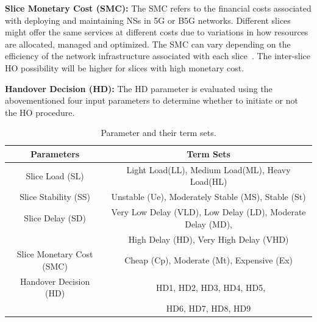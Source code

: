 \documentclass[graybox]{svmult}
\begin{document}
\textbf{Slice Monetary Cost (SMC):} The SMC refers to the financial costs associated with deploying and maintaining NSs in 5G or B5G networks. Different slices might offer the same services at different costs due to variations in how resources are allocated, managed and optimized. The SMC can vary depending on the efficiency of the network infrastructure associated with each slice~\cite{walia2021virtualization}. The inter-slice HO possibility will be higher for slices with high monetary cost. 

\textbf{Handover Decision (HD):} The HD parameter is evaluated using the abovementioned four input parameters to determine whether to initiate or not the HO procedure. 


\begin{table}\centering
	\caption{Parameter and their term sets.}
	\label{tab:Parameter}%
	\begin{tabular}{c | c }\hline
		Parameters & Term Sets \\\hline
	    Slice Load (SL) & Light Load(LL), Medium Load(ML), Heavy Load(HL) \\\hline
		Slice Stability (SS) & Unstable (Ue), Moderately Stable (MS), Stable (St) \\\hline
		Slice Delay (SD) & Very Low Delay (VLD), Low Delay (LD), Moderate Delay (MD), \\
		&High Delay (HD), Very High Delay (VHD) \\\hline
		Slice Monetary Cost (SMC) & Cheap (Cp), Moderate (Mt), Expensive (Ex) \\\hline 
		Handover Decision (HD) & ~HD1, HD2, HD3, HD4, HD5, \\
		& HD6, HD7, HD8, HD9\\
		\hline
	\end{tabular}	
\end{table}
\end{document}
